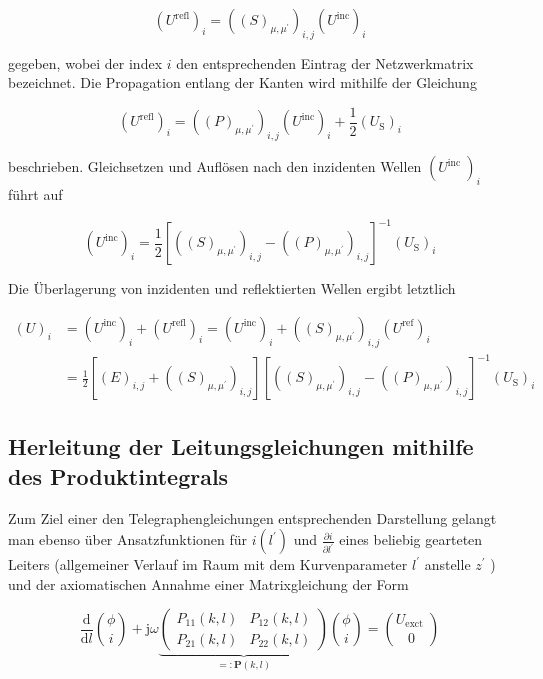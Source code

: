 \begin{equation}
	\left(U^{\mathrm{refl}}\right)_{i}=\left((S)_{\mu, \mu^{\prime}}\right)_{i, j}\left(U^{\mathrm{inc}}\right)_{i} 
\end{equation}


gegeben, wobei der index $i$ den entsprechenden Eintrag der Netzwerkmatrix bezeichnet. Die Propagation entlang der Kanten wird mithilfe der Gleichung


\begin{equation}
	\left(U^{\mathrm{refl}}\right)_{i}=\left((P)_{\mu, \mu^{\prime}}\right)_{i, j}\left(U^{\mathrm{inc}}\right)_{i}+\frac{1}{2}\left(U_{\mathrm{S}}\right)_{i} 
\end{equation}


beschrieben. Gleichsetzen und Auflösen nach den inzidenten Wellen $\left(U^{\text {inc }}\right)_{i}$ führt auf


\begin{equation}
	\left(U^{\mathrm{inc}}\right)_{i}=\frac{1}{2}\left[\left((S)_{\mu, \mu^{\prime}}\right)_{i, j}-\left((P)_{\mu, \mu^{\prime}}\right)_{i, j}\right]^{-1}\left(U_{\mathrm{S}}\right)_{i} 
\end{equation}


Die Überlagerung von inzidenten und reflektierten Wellen ergibt letztlich


\begin{align}
	(U)_{i} & =\left(U^{\mathrm{inc}}\right)_{i}+\left(U^{\mathrm{refl}}\right)_{i}=\left(U^{\mathrm{inc}}\right)_{i}+\left((S)_{\mu, \mu^{\prime}}\right)_{i, j}\left(U^{\mathrm{ref}}\right)_{i}  \\
	& =\frac{1}{2}\left[(E)_{i, j}+\left((S)_{\mu, \mu^{\prime}}\right)_{i, j}\right]\left[\left((S)_{\mu, \mu^{\prime}}\right)_{i, j}-\left((P)_{\mu, \mu^{\prime}}\right)_{i, j}\right]^{-1}\left(U_{\mathrm{S}}\right)_{i} 
\end{align}
\subsection{Herleitung der Leitungsgleichungen mithilfe des Produktintegrals}
Zum Ziel einer den Telegraphengleichungen entsprechenden Darstellung gelangt man ebenso über Ansatzfunktionen für $i\left(l^{\prime}\right)$ und $\frac{\partial i}{\partial l^{\prime}}$ eines beliebig gearteten Leiters (allgemeiner Verlauf im Raum mit dem Kurvenparameter $l^{\prime}$ anstelle $z^{\prime}$ ) und der axiomatischen Annahme einer Matrixgleichung der Form

\begin{equation}
	\frac{\mathrm{d}}{\mathrm{d} l}\binom{\phi}{i}+\mathrm{j} \omega \underbrace{\left(\begin{array}{ll}
			P_{11}(k, l) & P_{12}(k, l)  \\
			P_{21}(k, l) & P_{22}(k, l)
		\end{array}\right)}_{=: \mathbf{P}(k, l)}\binom{\phi}{i}=\binom{U_{\text {exct }}}{0}
\end{equation}

